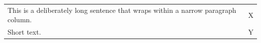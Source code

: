\documentclass{article}
\begin{document}
\begin{tabular}{p{3cm}l}
This is a deliberately long sentence that wraps within a narrow paragraph column. & X \\
Short text. & Y
\end{tabular}
\end{document}
